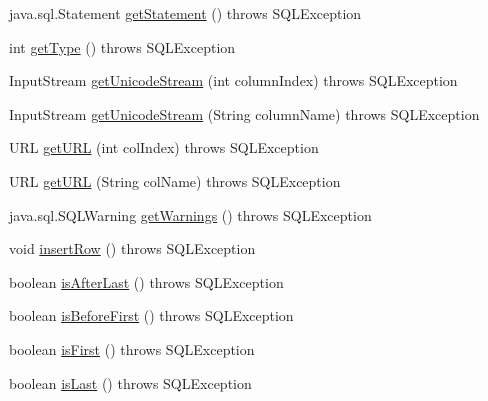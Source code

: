 \begin{DoxyCompactItemize}
java.\+sql.\+Statement \mbox{\hyperlink{classcom_1_1mysql_1_1cj_1_1jdbc_1_1result_1_1_result_set_impl_aa93b35c26ae9e8707ad703e40d5c2bff}{get\+Statement}} ()  throws S\+Q\+L\+Exception 
\item 
int \mbox{\hyperlink{classcom_1_1mysql_1_1cj_1_1jdbc_1_1result_1_1_result_set_impl_abde00cbe923772688815f6adc617ac9d}{get\+Type}} ()  throws S\+Q\+L\+Exception 
\item 
Input\+Stream \mbox{\hyperlink{classcom_1_1mysql_1_1cj_1_1jdbc_1_1result_1_1_result_set_impl_a784e00f0c74e5e75fca985a0a9ff028d}{get\+Unicode\+Stream}} (int column\+Index)  throws S\+Q\+L\+Exception 
\item 
Input\+Stream \mbox{\hyperlink{classcom_1_1mysql_1_1cj_1_1jdbc_1_1result_1_1_result_set_impl_a7909bbbb222c3e827d751336e88d0064}{get\+Unicode\+Stream}} (String column\+Name)  throws S\+Q\+L\+Exception 
\item 
U\+RL \mbox{\hyperlink{classcom_1_1mysql_1_1cj_1_1jdbc_1_1result_1_1_result_set_impl_a01de8a4128adfa8730b376e1d15f4ad4}{get\+U\+RL}} (int col\+Index)  throws S\+Q\+L\+Exception 
\item 
U\+RL \mbox{\hyperlink{classcom_1_1mysql_1_1cj_1_1jdbc_1_1result_1_1_result_set_impl_a5a86582669418bcc8050d97acf095740}{get\+U\+RL}} (String col\+Name)  throws S\+Q\+L\+Exception 
\item 
java.\+sql.\+S\+Q\+L\+Warning \mbox{\hyperlink{classcom_1_1mysql_1_1cj_1_1jdbc_1_1result_1_1_result_set_impl_a1602a8c3110b23aac3f0780810f117d0}{get\+Warnings}} ()  throws S\+Q\+L\+Exception 
\item 
void \mbox{\hyperlink{classcom_1_1mysql_1_1cj_1_1jdbc_1_1result_1_1_result_set_impl_a3be625f1dc24e0768f9c8d3cfb731443}{insert\+Row}} ()  throws S\+Q\+L\+Exception 
\item 
boolean \mbox{\hyperlink{classcom_1_1mysql_1_1cj_1_1jdbc_1_1result_1_1_result_set_impl_a8f70cf5377b2ebf196c98c1c23b2bd64}{is\+After\+Last}} ()  throws S\+Q\+L\+Exception 
\item 
boolean \mbox{\hyperlink{classcom_1_1mysql_1_1cj_1_1jdbc_1_1result_1_1_result_set_impl_a24ce710cd9b39ccaaf34da51950f4f9e}{is\+Before\+First}} ()  throws S\+Q\+L\+Exception 
\item 
boolean \mbox{\hyperlink{classcom_1_1mysql_1_1cj_1_1jdbc_1_1result_1_1_result_set_impl_af3064f804667ca0ed8304a56fe4f07ec}{is\+First}} ()  throws S\+Q\+L\+Exception 
\item 
boolean \mbox{\hyperlink{classcom_1_1mysql_1_1cj_1_1jdbc_1_1result_1_1_result_set_impl_a5d73fcfeda3ceec9476df9700f6dfbee}{is\+Last}} ()  throws S\+Q\+L\+Exception 

\end{DoxyCompactItemize}
